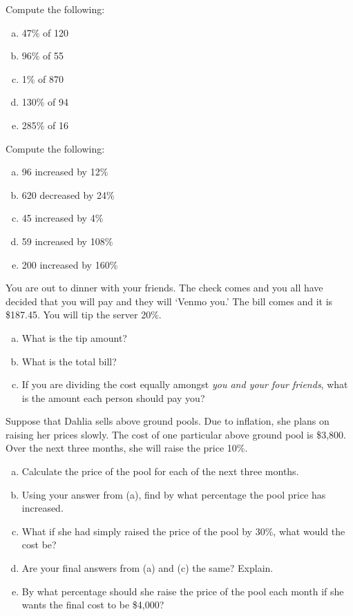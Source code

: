 \documentclass[11pt,letterpaper]{article}
\begin{document}

 Compute the following:
	\begin{enumerate}[(a)]
	\item 47\% of 120
	\item 96\% of 55
	\item 1\% of 870
	\item 130\% of 94
	\item 285\% of 16
	\end{enumerate}



\newpage



 Compute the following:
	\begin{enumerate}[(a)]
	\item 96 increased by 12\%
	\item 620 decreased by 24\%
	\item 45 increased by 4\% 
	\item 59 increased by 108\%
	\item 200 increased by 160\%
	\end{enumerate} 



\newpage



 You are out to dinner with your friends. The check comes and you all have decided that you will pay and they will `Venmo you.' The bill comes and it is \$187.45. You will tip the server 20\%. 
	\begin{enumerate}[(a)]
	\item What is the tip amount?
	\item What is the total bill?
	\item If you are dividing the cost equally amongst \textit{you and your four friends}, what is the amount each person should pay you?
	\end{enumerate}



\newpage



 Suppose that Dahlia sells above ground pools. Due to inflation, she plans on raising her prices slowly. The cost of one particular above ground pool is \$3,800. Over the next three months, she will raise the price 10\%. 
	\begin{enumerate}[(a)]
	\item Calculate the price of the pool for each of the next three months. 
	\item Using your answer from (a), find by what percentage the pool price has increased. 
	\item What if she had simply raised the price of the pool by 30\%, what would the cost be?
	\item Are your final answers from (a) and (c) the same? Explain. 
	\item By what percentage should she raise the price of the pool each month if she wants the final cost to be \$4,000?
	\end{enumerate} 
\end{document}

